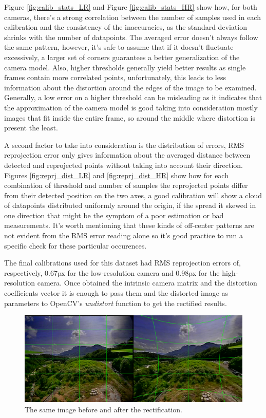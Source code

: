 Figure \ref{fig:calib_stats_LR} and Figure \ref{fig:calib_stats_HR} show how, for both cameras, there's a strong correlation between the number of samples used in each calibration and the consistency of the inaccuracies, as the standard deviation shrinks with the number of datapoints. The averaged error doesn't always follow the same pattern, however, it's safe to assume that if it doesn't fluctuate excessively, a larger set of corners guarantees a better generalization of the camera model. Also, higher thresholds generally yield better results as single frames contain more correlated points, unfortunately, this leads to less information about the distortion around the edges of the image to be examined. Generally, a low error on a higher threshold can be misleading as it indicates that the approximation of the camera model is good taking into consideration mostly images that fit inside the entire frame, so around the middle where distortion is present the least.

A second factor to take into consideration is the distribution of errors, RMS reprojection error only gives information about the averaged distance between detected and reprojected points without taking into account their direction. Figures \ref{fig:reprj_dist_LR} and \ref{fig:reprj_dist_HR} show how for each combination of threshold and number of samples the reprojected points differ from their detected position on the two axes, a good calibration will show a cloud of datapoints distributed uniformly around the origin, if the spread it skewed in one direction that might be the symptom of a poor estimation or bad measurements. It's worth mentioning that these kinds of off-center patterns are not evident from the RMS error reading alone so it's good practice to run a specific check for these particular occurences.

The final calibrations used for this dataset had RMS reprojection errors of, respectively, 0.67px for the low-resolution camera and 0.98px for the high-resolution camera. Once obtained the intrinsic camera matrix and the distortion coefficients vector it is enough to pass them and the distorted image as parameters to OpenCV's \emph{undistort} function to get the rectified results.

\begin{figure}[H]
  \centering
  \includegraphics[width=1\textwidth]{figures/bef_aft_rect.png}
  \caption{The same image before and after the rectification.}
  \label{img:rectify_sbs}
\end{figure}

